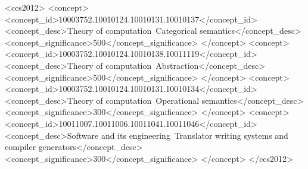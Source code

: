 \begin{CCSXML}
  <ccs2012>
  <concept>
  <concept_id>10003752.10010124.10010131.10010137</concept_id>
  <concept_desc>Theory of computation~Categorical semantics</concept_desc>
  <concept_significance>500</concept_significance>
  </concept>
  <concept>
  <concept_id>10003752.10010124.10010138.10011119</concept_id>
  <concept_desc>Theory of computation~Abstraction</concept_desc>
  <concept_significance>500</concept_significance>
  </concept>
  <concept>
  <concept_id>10003752.10010124.10010131.10010134</concept_id>
  <concept_desc>Theory of computation~Operational semantics</concept_desc>
  <concept_significance>300</concept_significance>
  </concept>
  <concept>
  <concept_id>10011007.10011006.10011041.10011046</concept_id>
  <concept_desc>Software and its engineering~Translator writing systems and compiler generators</concept_desc>
  <concept_significance>300</concept_significance>
  </concept>
  </ccs2012>
\end{CCSXML}


